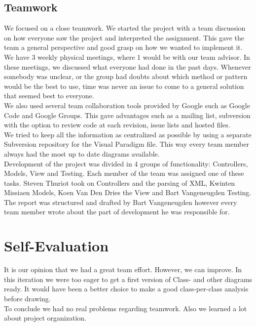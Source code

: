 		\subsection{Teamwork}
		We focused on a close teamwork. We started the project with a team discussion on how everyone saw the project and interpreted the assignment. This gave the team a general perspective and good grasp on how we wanted to implement it.\\
		We have 3 weekly physical meetings, where 1 would be with our team advisor. In these meetings, we discussed what everyone had done in the past days. Whenever somebody was unclear, or the group had doubts about which method or pattern would be the best to use, time was never an issue to come to a general solution that seemed best to everyone.\\
		We also used several team collaboration tools provided by Google such as Google Code and Google Groups. This gave advantages such as a mailing list, subversion with the option to review code at each revision, issue lists and hosted files.\\
		We tried to keep all the information as centralized as possible by using a separate Subversion repository for the Visual Paradigm file. This way every team member always had the most up to date diagrams available.\\
		Development of the project was divided in 4 groups of functionality: Controllers, Models, View and Testing. Each member of the team was assigned one of these tasks. Steven Thuriot took on Controllers and the parsing of XML, Kwinten Missiaen Models, Koen Van Den Dries the View and Bart Vangeneugden Testing. The report was structured and drafted by Bart Vangeneugden however every team member wrote about the part of development he was responsible for.
	\section{Self-Evaluation}
	It is our opinion that we had a great team effort. However, we can improve. In this iteration we were too eager to get a first version of Class- and other diagrams ready. It would have been a better choice to make a good class-per-class analysis before drawing.\\
	To conclude we had no real problems regarding teamwork. Also we learned a lot about project organization.
